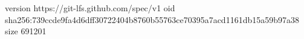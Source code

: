 version https://git-lfs.github.com/spec/v1
oid sha256:739ccde9fa4d6dff30722404b8760b55763ce70395a7acd1161db15a59b97a38
size 691201
